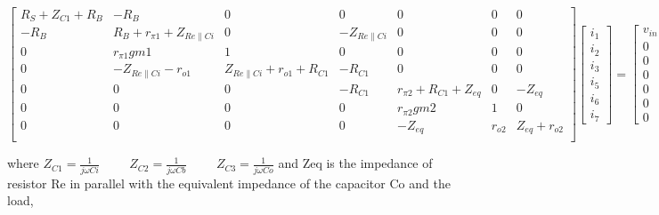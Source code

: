 \[
  \begin{bmatrix}
    R_{S} + Z_{C1} + R_{B} & -R_{B }                                 & 0                                     & 0                    & 0                           & 0      & 0               \\
    -R_{B}                 & R_{B} + r_{\pi 1} + Z_{Re \parallel Ci} & 0                                     & -Z_{Re \parallel Ci} & 0                           & 0      & 0               \\
    0                      & r_{\pi 1} gm1                           & 1                                     & 0                    & 0                           & 0      & 0               \\
    0                      & -Z_{Re     \parallel Ci} - r_{o1}       & Z_{Re \parallel Ci} + r_{o1} + R_{C1} & -R_{C1}              & 0                           & 0      & 0               \\
    0                      & 0                                       & 0                                     & -R_{C1}              & r_{\pi 2} + R_{C1} + Z_{eq} & 0      & -Z_{eq}         \\
    0                      & 0                                       & 0                                     & 0                    & r_{\pi 2} gm2               & 1      & 0               \\
    0                      & 0                                       & 0                                     & 0                    & -Z_{eq}                     & r_{o2} & Z_{eq} + r_{o2} \\
  \end{bmatrix}
  \begin{bmatrix}
    i_1 \\ i_2  \\ i_3 \\ i_5 \\ i_6 \\ i_7
  \end{bmatrix}
  =
  \begin{bmatrix}
    v_{in} \\ 0 \\ 0 \\ 0 \\ 0  \\ 0 \\ 0
  \end{bmatrix}
\]

where $Z_{C1} = \frac{1}{j \omega Ci} \hspace{1cm} Z_{C2} = \frac{1}{j \omega Cb} \hspace{1cm} Z_{C3} = \frac{1}{j \omega Co}$
and Zeq is the impedance of resistor Re in parallel with the equivalent impedance of the capacitor Co and the load,


